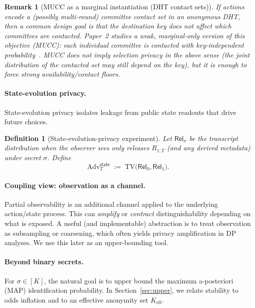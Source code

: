 \documentclass[11pt]{article}
\newtheorem{definition}{Definition}
\newtheorem{remark}{Remark}
\newcommand{\Adv}{\mathrm{Adv}}
\newcommand{\TV}{\mathrm{TV}}
\begin{document}
\begin{remark}[MUCC as a marginal instantiation (DHT contact sets)]
If actions encode a (possibly multi-round) committee contact set in an anonymous DHT, then a common design goal is that the destination key does not affect which committees are contacted.
Paper~2 studies a weak, marginal-only version of this objective (MUCC): each individual committee is contacted with key-independent probability~\cite{series:state2}.
MUCC does \emph{not} imply selection privacy in the above sense (the joint distribution of the contacted set may still depend on the key), but it is enough to force strong availability/contact floors.
\end{remark}

\paragraph{State-evolution privacy.}
State-evolution privacy isolates leakage from public state readouts that drive future choices.

\begin{definition}[State-evolution-privacy experiment]
Let $\mathsf{Rel}_\sigma$ be the transcript distribution when the observer sees only releases $R_{1:T}$ (and any derived metadata) under secret $\sigma$.
Define
\[
\Adv^{\mathsf{state}}_T \;:=\; \TV\big(\mathsf{Rel}_0,\mathsf{Rel}_1\big).
\]
\end{definition}

\paragraph{Coupling view: observation as a channel.}
Partial observability is an additional channel applied to the underlying action/state process.
This can \emph{amplify} or \emph{contract} distinguishability depending on what is exposed.
A useful (and implementable) abstraction is to treat observation as subsampling or coarsening, which often yields privacy amplification in DP analyses.
We use this later as an upper-bounding tool.

\paragraph{Beyond binary secrets.}
For $\sigma\in[K]$, the natural goal is to upper bound the maximum a-posteriori (MAP) identification probability.
In Section~\ref{sec:upper}, we relate stability to odds inflation and to an effective anonymity set $K_{\mathrm{eff}}$.
\end{document}
